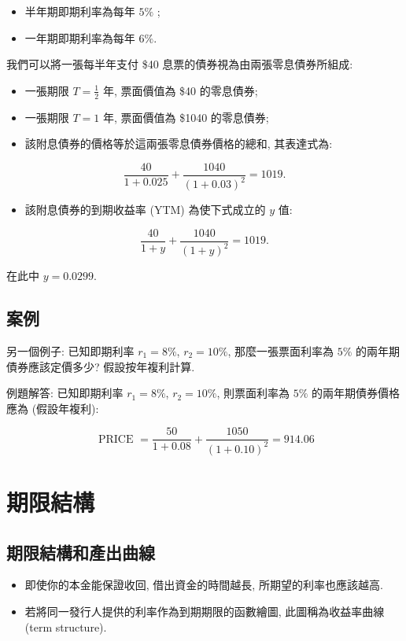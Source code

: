 \documentclass[letterpaper]{article}
\begin{document}
		\begin{itemize}
			\item 半年期即期利率為每年 \(5\%\) ; 
			\item 一年期即期利率為每年 \(6\%\).  
		\end{itemize}
		
		我們可以將一張每半年支付 \$40 息票的債券視為由兩張零息債券所組成: 
		
		\begin{itemize}
			\item 一張期限 \(T = \tfrac{1}{2}\) 年, 票面價值為 \$40 的零息債券; 
			\item 一張期限 \(T = 1\) 年, 票面價值為 \$1040 的零息債券; 
			\item 該附息債券的價格等於這兩張零息債券價格的總和, 其表達式為: 
		\end{itemize}
		
		
		$$
		\frac{40}{1+0.025}+\frac{1040}{ (1+0.03) ^{2}}=1019 .
		$$
		
		\begin{itemize}
			\item 該附息債券的到期收益率 (YTM) 為使下式成立的 \( y \) 值: 
		\end{itemize}
		
		
		$$
		\frac{40}{1+y}+\frac{1040}{ (1+y) ^{2}}=1019 .
		$$
		
		在此中 $y=0.0299$.
		
		\subsection{案例}
		另一個例子: 已知即期利率 \(r_{1} = 8\%\), \(r_{2} = 10\%\), 那麼一張票面利率為 \(5\%\) 的兩年期債券應該定價多少? 假設按年複利計算.  
		
		例題解答: 已知即期利率 \(r_{1} = 8\%\), \(r_{2} = 10\%\), 則票面利率為 \(5\%\) 的兩年期債券價格應為 (假設年複利): 
		
		
		$$
		\text { PRICE }=\frac{50}{1+0.08}+\frac{1050}{ (1+0.10) ^{2}}=914.06
		$$
		
		\section{期限結構}
		\subsection{期限結構和產出曲線}
		\begin{itemize}
			\item 即使你的本金能保證收回, 借出資金的時間越長, 所期望的利率也應該越高.  
			\item 若將同一發行人提供的利率作為到期期限的函數繪圖, 此圖稱為收益率曲線 (term structure).  
		\end{itemize}
		
\end{document}
